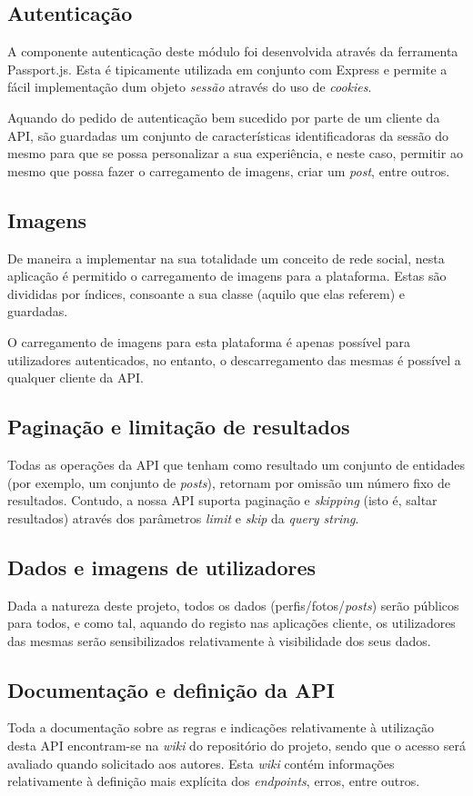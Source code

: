 \subsection{Autenticação}
A componente autenticação deste módulo foi desenvolvida através da ferramenta Passport.js. Esta é tipicamente utilizada em conjunto com Express e permite a fácil implementação dum objeto \textit{sessão} através do uso de \textit{cookies}. \par \medskip

Aquando do pedido de autenticação bem sucedido por parte de um cliente da API, são guardadas um conjunto de características identificadoras da sessão do mesmo para que se possa personalizar a sua experiência, e neste caso, permitir ao mesmo que possa fazer o carregamento de imagens, criar um \textit{post}, entre outros. \par \medskip

\subsection{Imagens}
De maneira a implementar na sua totalidade um conceito de rede social, nesta aplicação é permitido o carregamento de imagens para a plataforma. Estas são divididas por índices, consoante a sua classe (aquilo que elas referem) e guardadas. \par \medskip

O carregamento de imagens para esta plataforma é apenas possível para utilizadores autenticados, no entanto, o descarregamento das mesmas é possível a qualquer cliente da API.

\subsection{Paginação e limitação de resultados}
Todas as operações da API que tenham como resultado um conjunto de entidades (por exemplo, um conjunto de \textit{posts}), retornam por omissão um número fixo de resultados. Contudo, a nossa API suporta paginação e \textit{skipping} (isto é, saltar resultados) através dos parâmetros \textit{limit} e \textit{skip} da \textit{query string}.

\subsection{Dados e imagens de utilizadores}
Dada a natureza deste projeto, todos os dados (perfis/fotos/\textit{posts}) serão públicos para todos, e como tal, aquando do registo nas aplicações cliente, os utilizadores das mesmas serão sensibilizados relativamente à visibilidade dos seus dados.

\subsection{Documentação e definição da API}
Toda a documentação sobre as regras e indicações relativamente à utilização desta API encontram-se na \textit{wiki} do repositório do projeto, sendo que o acesso será avaliado quando solicitado aos autores. Esta \textit{wiki} contém informações relativamente à definição mais explícita dos \textit{endpoints}, erros, entre outros.

\fi